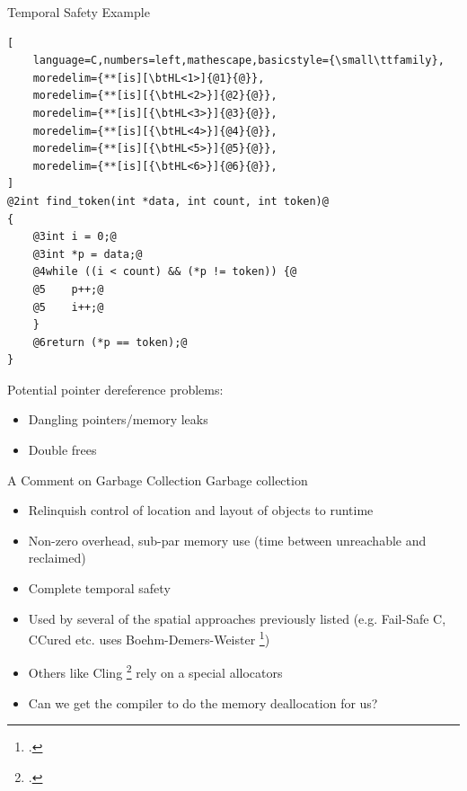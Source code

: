 \documentclass[aspectratio=169]{beamer}
\begin{document}
\begin{frame}[fragile]{Temporal Safety Example}
\footnotesize
{}
\begin{lstlisting}[
    language=C,numbers=left,mathescape,basicstyle={\small\ttfamily},
    moredelim={**[is][\btHL<1>]{@1}{@}},
    moredelim={**[is][{\btHL<2>}]{@2}{@}},
    moredelim={**[is][{\btHL<3>}]{@3}{@}},
    moredelim={**[is][{\btHL<4>}]{@4}{@}},
    moredelim={**[is][{\btHL<5>}]{@5}{@}},
    moredelim={**[is][{\btHL<6>}]{@6}{@}},
]
@2int find_token(int *data, int count, int token)@
{
    @3int i = 0;@
    @3int *p = data;@
    @4while ((i < count) && (*p != token)) {@
    @5    p++;@
    @5    i++;@
    }
    @6return (*p == token);@
}
\end{lstlisting}


\footnotesize{
Potential pointer dereference problems:
  \begin{itemize}
      \item Dangling pointers/memory leaks
      \item Double frees
  \end{itemize}
}
\end{frame}

\begin{frame}{A Comment on Garbage Collection}
Garbage collection
    \begin{itemize}
        \item Relinquish control of location and layout of objects to runtime
        \item Non-zero overhead, sub-par memory use (time between unreachable and reclaimed)
        \item Complete temporal safety
        \item Used by several of the spatial approaches previously listed (e.g. Fail-Safe C, CCured etc. uses Boehm-Demers-Weister \footcite{boehm_garbage_1988})
        \item Others like Cling \footcite{akritidis_cling:_???} rely on a special allocators %
        \item Can we get the \alert{compiler} to do the memory deallocation for us? %
    \end{itemize}
\end{frame}
\end{document}
